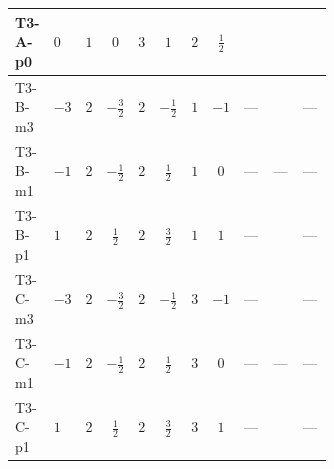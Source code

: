 \documentclass[8pt]{article}
\begin{document}
\begin{landscape}
\begin{longtable}{@{}llcccccc >{\raggedright\arraybackslash}p{0.21\linewidth} >{\raggedright\arraybackslash}p{0.21\linewidth} >{\raggedright\arraybackslash}p{0.21\linewidth}@{}}
\midrule
T3-A-p0 & $0$ & $1$ & $0$ & $3$ & $1$ & $2$ & $\frac{1}{2}$ & \scriptsize\adjustbox{max width=\linewidth}{$\begin{gathered} {m_2^2} (2 T_{\nu}^{(2)}+8 {\lambda_{S_2}^{(1)}}+4 {\lambda_{S_2}^{(A)}})\end{gathered}$} & \scriptsize\adjustbox{max width=\linewidth}{$\begin{gathered} -4 \operatorname{Tr}\!\left({M_F}\,\left({y_2}\right)^{\dagger}\,{y_2}\,\left({M_F}\right)^{\dagger}\right)\end{gathered}$} & \scriptsize\adjustbox{max width=\linewidth}{$\begin{gathered} -12 {g_2}^2 {m_2^2}\end{gathered}$} \\
\midrule
T3-B-m3 & $-3$ & $2$ & $-\frac{3}{2}$ & $2$ & $-\frac{1}{2}$ & $1$ & $-1$ & --- & \scriptsize\adjustbox{max width=\linewidth}{$\begin{gathered} -4 \operatorname{Tr}\!\left({M_F}\,\left({y_2}\right)^{\dagger}\,{y_2}\,\left({M_F}\right)^{\dagger}\right)\end{gathered}$} & --- \\
\midrule
T3-B-m1 & $-1$ & $2$ & $-\frac{1}{2}$ & $2$ & $\frac{1}{2}$ & $1$ & $0$ & --- & --- & --- \\
\midrule
T3-B-p1 & $1$ & $2$ & $\frac{1}{2}$ & $2$ & $\frac{3}{2}$ & $1$ & $1$ & --- & \scriptsize\adjustbox{max width=\linewidth}{$\begin{gathered} -4 \operatorname{Tr}\!\left({M_F}\,\left({y_2}\right)^{\dagger}\,{y_2}\,\left({M_F}\right)^{\dagger}\right)\end{gathered}$} & --- \\
\midrule
T3-C-m3 & $-3$ & $2$ & $-\frac{3}{2}$ & $2$ & $-\frac{1}{2}$ & $3$ & $-1$ & --- & \scriptsize\adjustbox{max width=\linewidth}{$\begin{gathered} -6 \operatorname{Tr}\!\left({M_F}\,\left({y_2}\right)^{\dagger}\,{y_2}\,\left({M_F}\right)^{\dagger}\right)\end{gathered}$} & --- \\
\midrule
T3-C-m1 & $-1$ & $2$ & $-\frac{1}{2}$ & $2$ & $\frac{1}{2}$ & $3$ & $0$ & --- & --- & --- \\
\midrule
T3-C-p1 & $1$ & $2$ & $\frac{1}{2}$ & $2$ & $\frac{3}{2}$ & $3$ & $1$ & --- & \scriptsize\adjustbox{max width=\linewidth}{$\begin{gathered} -6 \operatorname{Tr}\!\left({M_F}\,\left({y_2}\right)^{\dagger}\,{y_2}\,\left({M_F}\right)^{\dagger}\right)\end{gathered}$} & --- \\

\end{longtable}
\end{landscape}
\end{document}
